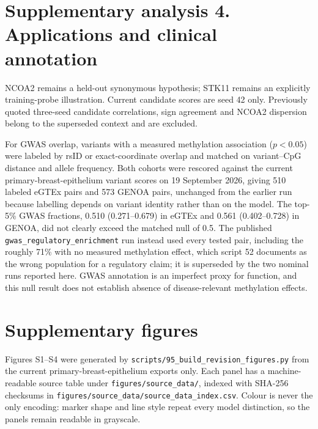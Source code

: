 \documentclass[10pt]{article}
\begin{document}
\section*{Supplementary analysis 4. Applications and clinical annotation}
NCOA2 remains a held-out synonymous hypothesis; STK11 remains an explicitly training-probe illustration. Current candidate scores are seed 42 only. Previously quoted three-seed candidate correlations, sign agreement and NCOA2 dispersion belong to the superseded context and are excluded.

For GWAS overlap, variants with a measured methylation association ($p<0.05$) were labeled by rsID or exact-coordinate overlap and matched on variant--CpG distance and allele frequency. Both cohorts were rescored against the current primary-breast-epithelium variant scores on 19 September 2026, giving 510 labeled eGTEx pairs and 573 GENOA pairs, unchanged from the earlier run because labelling depends on variant identity rather than on the model. The top-5\% GWAS fractions, 0.510 (0.271--0.679) in eGTEx and 0.561 (0.402--0.728) in GENOA, did not clearly exceed the matched null of 0.5. The published \texttt{gwas\_regulatory\_enrichment} run instead used every tested pair, including the roughly 71\% with no measured methylation effect, which script 52 documents as the wrong population for a regulatory claim; it is superseded by the two nominal runs reported here. GWAS annotation is an imperfect proxy for function, and this null result does not establish absence of disease-relevant methylation effects.

\section*{Supplementary figures}

Figures S1--S4 were generated by \texttt{scripts/95\_build\_revision\_figures.py} from the current
primary-breast-epithelium exports only. Each panel has a machine-readable source table under
\texttt{figures/source\_data/}, indexed with SHA-256 checksums in
\texttt{figures/source\_data/source\_data\_index.csv}. Colour is never the only encoding: marker shape
and line style repeat every model distinction, so the panels remain readable in grayscale.
\end{document}
